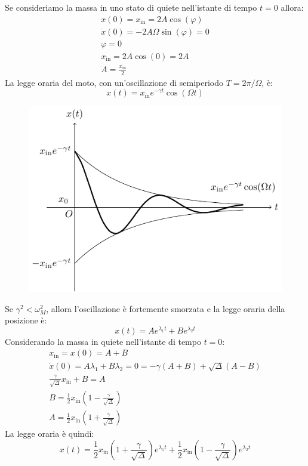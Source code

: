 \documentclass{article}
\numberwithin{equation}{subsection}
\begin{document}
Se consideriamo la massa in uno stato di quiete nell'istante 
di tempo $t=0$ allora:
\begin{gather*}
    x(0)=x_\mathrm{in}=2A\cos(\varphi)\\
    \dot x(0)=-2A\Omega \sin(\varphi)=0\\
    \varphi=0\\
    x_\mathrm{in}=2A\cos(0)=2A\\
    A=\displaystyle\frac{x_\mathrm{in}}{2}
\end{gather*}
La legge oraria del moto, con un'oscillazione di 
semiperiodo $T={2\pi}/{\Omega}$, è: 
\begin{equation}
    x(t)=x_\mathrm{in}e^{-\gamma t}\cos(\Omega t)
\end{equation}

\begin{figure}[H]%
    \centering
    \includegraphics{oscillatorio-1.pdf}%
\end{figure}

Se $\gamma^{2}<\omega_M^{2}$, allora l'oscillazione è fortemente 
smorzata e la legge oraria della posizione è:
\begin{equation*}
    x(t)=Ae^{\lambda_1t}+Be^{\lambda_2t}
\end{equation*}
Considerando la massa in quiete nell'istante di tempo $t=0$: 
\begin{gather*}
    x_\mathrm{in}=x(0)=A+B\\
    \dot x(0)=A\lambda_1+B\lambda_2=0=-\gamma(A+B)+\sqrt{\Delta}(A-B)\\
    \displaystyle\frac{\gamma}{\sqrt{\Delta}}x_\mathrm{in}+B=A\\
    B=\displaystyle\frac{1}{2}x_\mathrm{in}\left(1-\displaystyle\frac{\gamma}{\sqrt{\Delta}}\right)\\
    A=\displaystyle\frac{1}{2}x_\mathrm{in}\left(1+\displaystyle\frac{\gamma}{\sqrt{\Delta}}\right)
\end{gather*}
La legge oraria è quindi:
\begin{equation}
    x(t)=\displaystyle\frac{1}{2}x_\mathrm{in}\left(1+\displaystyle\frac{\gamma}{\sqrt{\Delta}}\right)e^{\lambda_1t}+\displaystyle\frac{1}{2}x_\mathrm{in}\left(1-\displaystyle\frac{\gamma}{\sqrt{\Delta}}\right)e^{\lambda_2t}
\end{equation}
\end{document}
